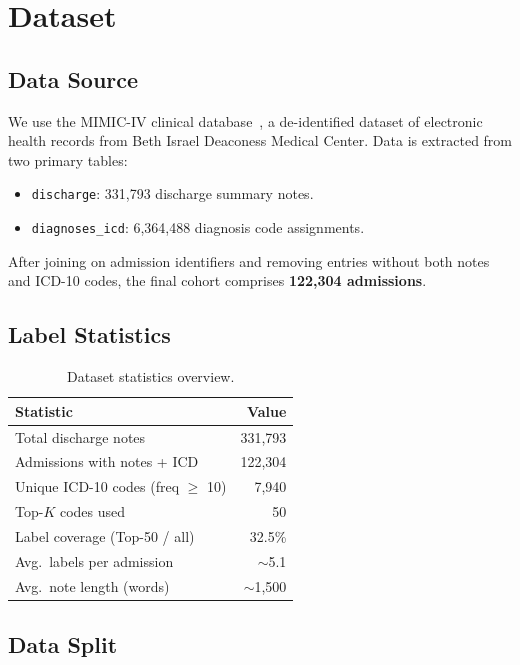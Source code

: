 \documentclass[11pt,a4paper]{article}
\begin{document}
\section{Dataset}

\subsection{Data Source}
We use the MIMIC-IV clinical database~\cite{johnson2023mimiciv}, a de-identified dataset of electronic health records from Beth Israel Deaconess Medical Center. Data is extracted from two primary tables:
\begin{itemize}[nosep,leftmargin=1.5em]
    \item \texttt{discharge}: 331,793 discharge summary notes.
    \item \texttt{diagnoses\_icd}: 6,364,488 diagnosis code assignments.
\end{itemize}
After joining on admission identifiers and removing entries without both notes and ICD-10 codes, the final cohort comprises \textbf{122,304 admissions}.

\subsection{Label Statistics}

\begin{table}[H]
\centering
\caption{Dataset statistics overview.}
\label{tab:data_stats}
\small
\begin{tabular}{lr}
\toprule
\textbf{Statistic} & \textbf{Value} \\
\midrule
Total discharge notes         & 331,793 \\
Admissions with notes + ICD   & 122,304 \\
Unique ICD-10 codes (freq $\geq$ 10) & 7,940 \\
Top-$K$ codes used            & 50 \\
Label coverage (Top-50 / all) & 32.5\% \\
Avg.\ labels per admission   & $\sim$5.1 \\
Avg.\ note length (words)    & $\sim$1,500 \\
\bottomrule
\end{tabular}
\end{table}

\subsection{Data Split}
\end{document}
